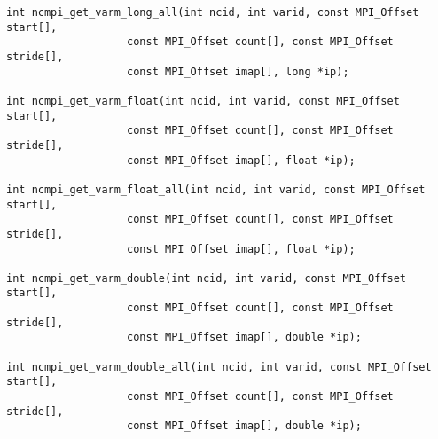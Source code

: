 \begin{verbatim}
int ncmpi_get_varm_long_all(int ncid, int varid, const MPI_Offset start[],
                   const MPI_Offset count[], const MPI_Offset stride[],
                   const MPI_Offset imap[], long *ip);

int ncmpi_get_varm_float(int ncid, int varid, const MPI_Offset start[],
                   const MPI_Offset count[], const MPI_Offset stride[],
                   const MPI_Offset imap[], float *ip);

int ncmpi_get_varm_float_all(int ncid, int varid, const MPI_Offset start[],
                   const MPI_Offset count[], const MPI_Offset stride[],
                   const MPI_Offset imap[], float *ip);

int ncmpi_get_varm_double(int ncid, int varid, const MPI_Offset start[],
                   const MPI_Offset count[], const MPI_Offset stride[],
                   const MPI_Offset imap[], double *ip);

int ncmpi_get_varm_double_all(int ncid, int varid, const MPI_Offset start[],
                   const MPI_Offset count[], const MPI_Offset stride[],
                   const MPI_Offset imap[], double *ip);
\end{verbatim}
